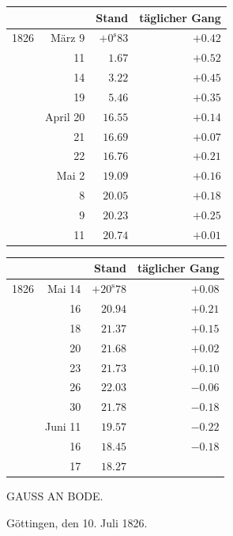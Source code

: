 \begin{center}
\begingroup\small\setlength{\tabcolsep}{5pt}
\begin{tabular}{lr|r|r}
 & & Stand & täglicher Gang \\
\hline
1826 & März 9 & $+0^{\mathrm s}83$ & $+0.42$ \\
 & 11 & $1.67$ & $+0.52$ \\
 & 14 & $3.22$ & $+0.45$ \\
 & 19 & $5.46$ & $+0.35$ \\
 & April 20 & $16.55$ & $+0.14$ \\
 & 21 & $16.69$ & $+0.07$ \\
 & 22 & $16.76$ & $+0.21$ \\
 & Mai 2 & $19.09$ & $+0.16$ \\
 & 8 & $20.05$ & $+0.18$ \\
 & 9 & $20.23$ & $+0.25$ \\
 & 11 & $20.74$ & $+0.01$ \\
\end{tabular}
\par\medskip
\begin{tabular}{lr|r|r}
 & & Stand & täglicher Gang \\
\hline
1826 & Mai 14 & $+20^{\mathrm s}78$ & $+0.08$ \\
 & 16 & $20.94$ & $+0.21$ \\
 & 18 & $21.37$ & $+0.15$ \\
 & 20 & $21.68$ & $+0.02$ \\
 & 23 & $21.73$ & $+0.10$ \\
 & 26 & $22.03$ & $-0.06$ \\
 & 30 & $21.78$ & $-0.18$ \\
 & Juni 11 & $19.57$ & $-0.22$ \\
 & 16 & $18.45$ & $-0.18$ \\
 & 17 & $18.27$ &  \\
\end{tabular}
\endgroup
\end{center}

\par{}\bigskip
\hypertarget{native-459-bode}{}
\begin{center}{\large GAUSS AN BODE.}\end{center}


\begin{flushright}
Göttingen, den 10. Juli 1826.
\end{flushright}

